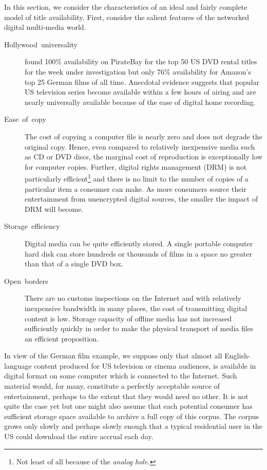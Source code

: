 \documentclass[12pt,english]{apa6}
\begin{document}
In this section, we consider the characteristics of an ideal and fairly
complete model of title availability. First, consider the salient
features of the networked digital multi-media world.
\begin{description}
\item [{Hollywood\ universality}] \citet{antoniades_one-click_2009} found
100\% availability on PirateBay for the top 50 US DVD rental titles
for the week under investigation but only 76\% availability for Amazon's
top 25 German films of all time. Anecdotal evidence suggests that
popular US television series become available within a few hours of
airing and are nearly universally available because of the ease of
digital home recording.
\item [{Ease\ of\ copy}] The cost of copying a computer file is nearly
zero and does not degrade the original copy. Hence, even compared
to relatively inexpensive media such as CD or DVD discs, the marginal
cost of reproduction is exceptionally low for computer copies. Further,
digital rights management (DRM) is not particularly efficient\footnote{Not least of all because of the \emph{analog hole.}} and there is no limit to the number of copies of a particular item
a consumer can make. As more consumers source their entertainment
from unencrypted digital sources, the smaller the impact of DRM will
become.
\item [{Storage~efficiency}] Digital media can be quite efficiently stored.
A single portable computer hard disk can store hundreds or thousands
of films in a space no greater than that of a single DVD box.
\item [{Open~borders}] There are no customs inspections on the Internet
and with relatively inexpensive bandwidth in many places, the cost
of transmitting digital content is low. Storage capacity of offline
media has not increased sufficiently quickly in order to make the
physical transport of media files an efficient proposition.
\end{description}
In view of the German film example, we suppose only that almost all
English-language content produced for US television or cinema audiences,
is available in digital format on some computer which is connected
to the Internet. Such material would, for many, constitute a perfectly
acceptable source of entertainment, perhaps to the extent that they
would need no other. It is not quite the case yet but one might also
assume that each potential consumer has sufficient storage space available
to archive a full copy of this corpus. The corpus grows only slowly
and perhaps slowly enough that a typical residential user in the US
could download the entire accrual each day.
\end{document}
